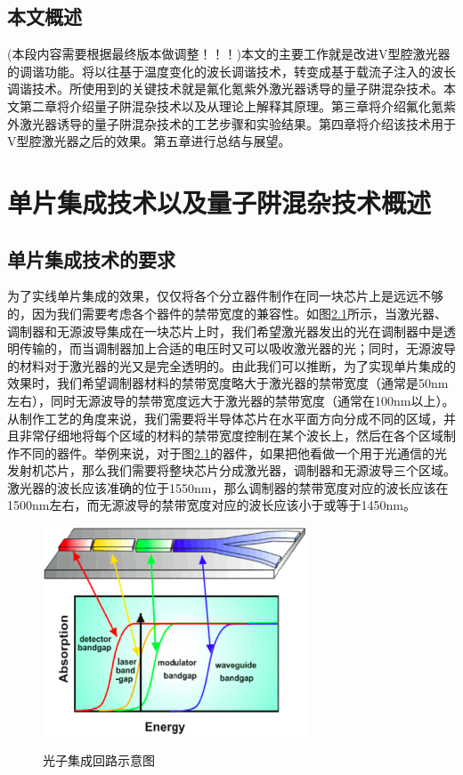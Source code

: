 \documentclass[oneside]{ZJUthesis}
\begin{document}
\section{本文概述}

(本段内容需要根据最终版本做调整！！！)本文的主要工作就是改进V型腔激光器的调谐功能。将以往基于温度变化的波长调谐技术，转变成基于载流子注入的波长调谐技术。所使用到的关键技术就是氟化氪紫外激光器诱导的量子阱混杂技术。本文第二章将介绍量子阱混杂技术以及从理论上解释其原理。第三章将介绍氟化氪紫外激光器诱导的量子阱混杂技术的工艺步骤和实验结果。第四章将介绍该技术用于V型腔激光器之后的效果。第五章进行总结与展望。

\chapter{单片集成技术以及量子阱混杂技术概述}

\section{单片集成技术的要求}

为了实线单片集成的效果，仅仅将各个分立器件制作在同一块芯片上是远远不够的，因为我们需要考虑各个器件的禁带宽度的兼容性。如图\ref{fig_pic}所示，当激光器、调制器和无源波导集成在一块芯片上时，我们希望激光器发出的光在调制器中是透明传输的，而当调制器加上合适的电压时又可以吸收激光器的光；同时，无源波导的材料对于激光器的光又是完全透明的。由此我们可以推断，为了实现单片集成的效果时，我们希望调制器材料的禁带宽度略大于激光器的禁带宽度（通常是50nm左右），同时无源波导的禁带宽度远大于激光器的禁带宽度（通常在100nm以上）。从制作工艺的角度来说，我们需要将半导体芯片在水平面方向分成不同的区域，并且非常仔细地将每个区域的材料的禁带宽度控制在某个波长上，然后在各个区域制作不同的器件。举例来说，对于图\ref{fig_pic}的器件，如果把他看做一个用于光通信的光发射机芯片，那么我们需要将整块芯片分成激光器，调制器和无源波导三个区域。激光器的波长应该准确的位于1550nm，那么调制器的禁带宽度对应的波长应该在1500nm左右，而无源波导的禁带宽度对应的波长应该小于或等于1450nm。

\begin{figure}[!h]
  \centering
  \includegraphics[width=0.7\textwidth]{./Pictures/pic.eps}\\
  \caption{光子集成回路示意图}
  \label{fig_pic}
\end{figure}
\end{document}
